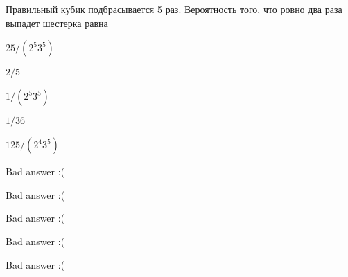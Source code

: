 
\begin{question}
Правильный кубик подбрасывается 5 раз. Вероятность того, что ровно два
раза выпадет шестерка равна
\begin{answerlist}
  \item \(25/(2^5 3^5)\)
  \item \(2/5\)
  \item \(1/(2^5 3^5)\)
  \item \(1/36\)
  \item \(125/(2^4 3^5)\)
\end{answerlist}
\end{question}

\begin{solution}
\begin{answerlist}
  \item Bad answer :(
  \item Bad answer :(
  \item Bad answer :(
  \item Bad answer :(
  \item Bad answer :(
\end{answerlist}
\end{solution}

